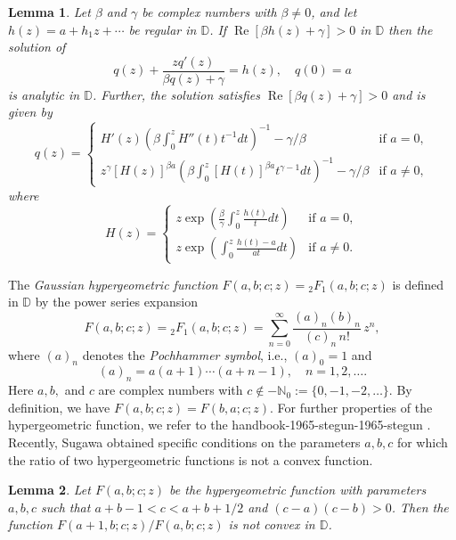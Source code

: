 \documentclass[a4paper,12pt]{amsart}
\newtheorem{lem}{Lemma}[section]
\theoremstyle{definition}
\begin{document}
\begin{lem}\label{T-29}\cite{miller-mocanu-1985} Let $\beta$ and $\gamma$ be complex numbers with $\beta \neq 0$, and let $h(z) = a + h_1 z + \cdots$ be regular in $\mathbb{D}$. If $\operatorname{Re}[\beta h(z) + \gamma] > 0$ in $\mathbb{D}$ then the solution of
$$
q(z) + \frac{z q'(z)}{\beta q(z)+\gamma} = h(z),\quad q(0) = a
$$
is analytic in $\mathbb{D}$. Further, the solution satisfies $\operatorname{Re}[\beta q(z) + \gamma] > 0$ and is given by
$$
q(z) =
\begin{cases}
H'(z) \left( \beta \int_{0}^{z} H''(t) t^{-1} dt \right)^{-1} - \gamma/\beta & \text{if } a = 0, \\[2mm]
z^{\gamma} [H(z)]^{\beta a} \left( \beta \int_{0}^{z} [H(t)]^{\beta a} t^{\gamma - 1} dt \right)^{-1} - \gamma/\beta & \text{if } a \neq 0,
\end{cases}
$$
where
$$
H(z) =
\begin{cases}
z \exp \left( \frac{\beta}{\gamma} \int_{0}^{z} \frac{h(t)}{t} dt \right) & \text{if } a = 0, \\[2mm]
z \exp \left( \int_{0}^{z} \frac{h(t) - a}{at} dt \right) & \text{if } a \neq 0.
\end{cases}
$$
\end{lem}





The \emph{Gaussian hypergeometric function} \( F(a,b;c;z)= {{}_{2}F_{1}}(a,b;c;z)\) is defined in \(\mathbb{D}\) by the power series expansion
\[
F(a,b;c;z)={{}_{2}F_{1}}(a,b;c;z) = \sum_{n=0}^{\infty} \frac{(a)_n (b)_n}{(c)_n \, n!} \, z^{n},
\]
where \((a)_n\) denotes the \emph{Pochhammer symbol}, i.e., \((a)_0 = 1\) and
\[
(a)_n = a(a+1) \dotsm (a+n-1), \quad n = 1,2,\dots.
\]
Here $a, b,$ and $c$ are complex numbers with \(c \notin -\mathbb{N}_0 := \{0,-1,-2,\dotsc\}\).
By definition, we have \(F(a,b;c;z) = F(b,a;c;z)\).
For further properties of the hypergeometric function, we refer to the handbook-1965-stegun-1965-stegun \cite{handbook-1965-stegun-1965-stegun}. Recently, Sugawa \cite{sugawa-wang-2024} obtained specific conditions on the parameters $a, b, c$ for which  the ratio of two hypergeometric functions is not a convex function. 

\begin{lem}\cite{sugawa-wang-2024}\label{T-43}
    Let $F(a, b; c; z)$ be the hypergeometric function with parameters $a,b,c$ such that $a + b - 1 < c < a + b + 1/2$ and $(c - a)(c - b) > 0$. Then the function
$F(a + 1, b; c; z)/F(a, b; c; z)$ is not convex in $\mathbb{D}$. 
\end{lem}
\end{document}
